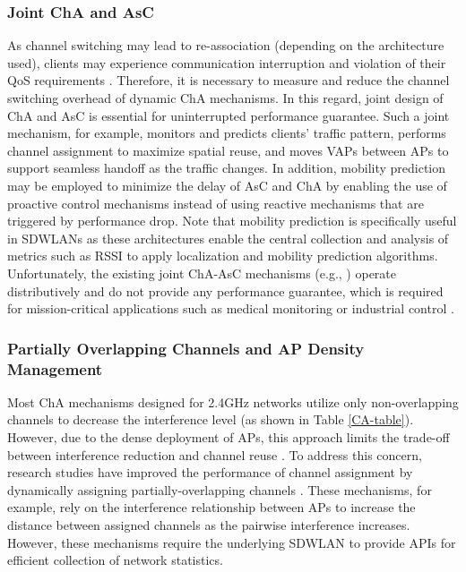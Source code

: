 \subsubsection{\textbf{Joint ChA and AsC}}
\label{asc_joint_des}
As channel switching may lead to re-association (depending on the architecture used), clients may experience communication interruption and violation of their QoS requirements \cite{SDWLAN2,Lv2013,jin2011fast}.
Therefore, it is necessary to measure and reduce the channel switching overhead of dynamic ChA mechanisms. 
In this regard, joint design of ChA and AsC is essential for uninterrupted performance guarantee.
Such a joint mechanism, for example, monitors and predicts clients' traffic pattern, performs channel assignment to maximize spatial reuse, and moves VAPs between APs to support seamless handoff as the traffic changes.
In addition, mobility prediction \cite{manweiler2013predicting,dong2012evaluation} may be employed to minimize the delay of AsC and ChA by enabling the use of proactive control mechanisms instead of using reactive mechanisms that are triggered by performance drop.
Note that mobility prediction is specifically useful in SDWLANs as these architectures enable the central collection and analysis of metrics such as RSSI to apply localization and mobility prediction algorithms.
Unfortunately, the existing joint ChA-AsC mechanisms (e.g., \cite{xu_channel_2011,Zheng2016}) operate distributively and do not provide any performance guarantee, which is required for  mission-critical applications such as medical monitoring or industrial control \cite{REWIMO}.




\subsubsection{\textbf{Partially Overlapping Channels and AP Density Management}}
\label{cha_part_overlap}
Most ChA mechanisms designed for 2.4GHz networks utilize only non-overlapping channels to decrease the interference level (as shown in Table \ref{CA-table}).
However, due to the dense deployment of APs, this approach limits the trade-off between interference reduction and channel reuse \cite{zhao_dapa:_2016}.
To address this concern, research studies have improved the performance of channel assignment by dynamically assigning partially-overlapping channels \cite{CA-F-WCNC-11}. 
These mechanisms, for example, rely on the interference relationship between APs to increase the distance between assigned channels as the pairwise interference increases.
However, these mechanisms require the underlying SDWLAN to provide APIs for efficient collection of network statistics.


